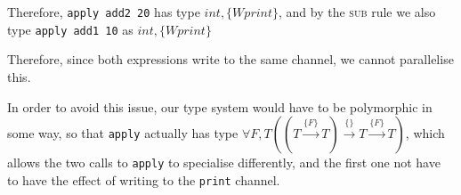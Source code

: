 \begin{enumerate}[label=(\alph*)]
        Therefore, \texttt{apply add2 20} has type $int, \{Wprint\}$, and by the \textsc{sub} rule we also type \texttt{apply add1 10} as $int, \{Wprint\}$

        Therefore, since both expressions write to the same channel, we cannot parallelise this.

        In order to avoid this issue, our type system would have to be polymorphic in some way, so that \texttt{apply} actually has type $\forall F, T ((T \xrightarrow{\{F\}} T) \xrightarrow{\{\}} T \xrightarrow{\{F\}} T)$, which allows the two calls to \texttt{apply} to specialise differently, and the first one not have to have the effect of writing to the \texttt{print} channel.


        
        
\end{enumerate}

